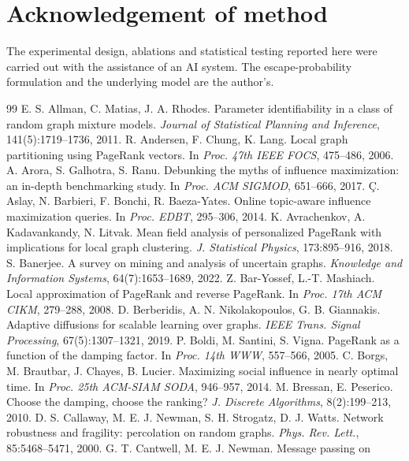 \documentclass[11pt,a4paper]{article}
\begin{document}
\section*{Acknowledgement of method}

The experimental design, ablations and statistical testing reported here were
carried out with the assistance of an AI system. The escape-probability
formulation and the underlying model are the author's.

\begin{thebibliography}{99}
\small
{} E. S. Allman, C. Matias, J. A. Rhodes. Parameter
identifiability in a class of random graph mixture models. \emph{Journal of
Statistical Planning and Inference}, 141(5):1719--1736, 2011.
 R. Andersen, F. Chung, K. Lang. Local graph partitioning using
PageRank vectors. In \emph{Proc. 47th IEEE FOCS}, 475--486, 2006.
 A. Arora, S. Galhotra, S. Ranu. Debunking the myths of
influence maximization: an in-depth benchmarking study. In \emph{Proc. ACM
SIGMOD}, 651--666, 2017.
 \c{C}. Aslay, N. Barbieri, F. Bonchi, R. Baeza-Yates.
Online topic-aware influence maximization queries. In \emph{Proc. EDBT},
295--306, 2014.
 K. Avrachenkov, A. Kadavankandy, N. Litvak. Mean field
analysis of personalized PageRank with implications for local graph clustering.
\emph{J. Statistical Physics}, 173:895--916, 2018.
 S. Banerjee. A survey on mining and analysis of
uncertain graphs. \emph{Knowledge and Information Systems},
64(7):1653--1689, 2022.
 Z. Bar-Yossef, L.-T. Mashiach. Local approximation of
PageRank and reverse PageRank. In \emph{Proc. 17th ACM CIKM}, 279--288, 2008.
 D. Berberidis, A. N. Nikolakopoulos, G. B. Giannakis.
Adaptive diffusions for scalable learning over graphs. \emph{IEEE Trans.
Signal Processing}, 67(5):1307--1321, 2019.
 P. Boldi, M. Santini, S. Vigna. PageRank as a function of the
damping factor. In \emph{Proc. 14th WWW}, 557--566, 2005.
 C. Borgs, M. Brautbar, J. Chayes, B. Lucier. Maximizing social
influence in nearly optimal time. In \emph{Proc. 25th ACM-SIAM SODA}, 946--957,
2014.
 M. Bressan, E. Peserico. Choose the damping, choose the
ranking? \emph{J. Discrete Algorithms}, 8(2):199--213, 2010.
 D. S. Callaway, M. E. J. Newman, S. H. Strogatz,
D. J. Watts. Network robustness and fragility: percolation on random graphs.
\emph{Phys. Rev. Lett.}, 85:5468--5471, 2000.
 G. T. Cantwell, M. E. J. Newman. Message passing on

\end{thebibliography}
\end{document}
